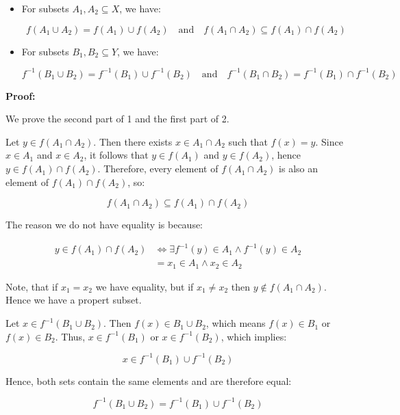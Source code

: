\begin{itemize}

	\item For subsets \( A_1, A_2 \subseteq X \), we have:

	      \[
		      f(A_1 \cup A_2) = f(A_1) \cup f(A_2)
		      \quad \text{and} \quad
		      f(A_1 \cap A_2) \subseteq f(A_1) \cap f(A_2)
	      \]

	\item For subsets \( B_1, B_2 \subseteq Y \), we have:
	      
	      \[
		      f^{-1}(B_1 \cup B_2) = f^{-1}(B_1) \cup f^{-1}(B_2)
		      \quad \text{and} \quad
		      f^{-1}(B_1 \cap B_2) = f^{-1}(B_1) \cap f^{-1}(B_2)
	      \]
\end{itemize}

\textbf{Proof:}

We prove the second part of 1 and the first part of 2.

Let \( y \in f(A_1 \cap A_2) \). Then there exists \( x \in A_1 \cap A_2 \) such that 
\( f(x) = y \). Since \( x \in A_1 \) and \( x \in A_2 \), it follows that \( y \in f(A_1) \) 
and \( y \in f(A_2) \), hence \( y \in f(A_1) \cap f(A_2) \). Therefore, every element of 
\( f(A_1 \cap A_2) \) is also an element of \( f(A_1) \cap f(A_2) \), so:

\[
	f(A_1 \cap A_2) \subseteq f(A_1) \cap f(A_2)
\]

The reason we do not have equality is because: 

\begin{align*}
	y \in f(A_1) \cap f(A_2) &\iff \exists f^{-1}(y) \in A_1 \land f^{-1}(y) \in A_2 \\
	&= x_1 \in A_1 \land x_2 \in A_2
\end{align*}

Note, that if \(x_1 = x_2\) we have equality, but if \(x_1 \neq x_2\) then \(y \notin f(A_1 \cap A_2)\). Hence 
we have a propert subset.

\QED

Let \( x \in f^{-1} (B_1 \cup B_2) \). Then \( f(x) \in B_1 \cup B_2 \), which means \( f(x) \in B_1 \) 
or \( f(x) \in B_2 \). Thus, \( x \in f^{-1}(B_1) \) 
or \( x \in f^{-1}(B_2) \), which implies:
	      
\[
	 x \in f^{-1}(B_1) \cup f^{-1}(B_2)
\]

Hence, both sets contain the same elements and are therefore equal:
	      
\[
	f^{-1}(B_1 \cup B_2) = f^{-1}(B_1) \cup f^{-1}(B_2)
\]

